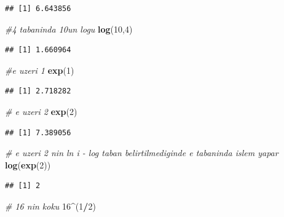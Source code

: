 \documentclass[
]{book}
\newenvironment{Shaded}{\begin{snugshade}}{\end{snugshade}}
\newcommand{\CommentTok}[1]{\textcolor[rgb]{0.56,0.35,0.01}{\textit{#1}}}
\newcommand{\DecValTok}[1]{\textcolor[rgb]{0.00,0.00,0.81}{#1}}
\newcommand{\KeywordTok}[1]{\textcolor[rgb]{0.13,0.29,0.53}{\textbf{#1}}}
\newcommand{\NormalTok}[1]{#1}
\newcommand{\OperatorTok}[1]{\textcolor[rgb]{0.81,0.36,0.00}{\textbf{#1}}}
\begin{document}
\begin{verbatim}
## [1] 6.643856
\end{verbatim}

\begin{Shaded}
\begin{Highlighting}[]
\CommentTok{\#4 tabaninda 10un log\textquotesingle{}u}
\KeywordTok{log}\NormalTok{(}\DecValTok{10}\NormalTok{,}\DecValTok{4}\NormalTok{) }
\end{Highlighting}
\end{Shaded}

\begin{verbatim}
## [1] 1.660964
\end{verbatim}

\begin{Shaded}
\begin{Highlighting}[]
\CommentTok{\#e uzeri 1}
\KeywordTok{exp}\NormalTok{(}\DecValTok{1}\NormalTok{) }
\end{Highlighting}
\end{Shaded}

\begin{verbatim}
## [1] 2.718282
\end{verbatim}

\begin{Shaded}
\begin{Highlighting}[]
\CommentTok{\# e uzeri 2}
\KeywordTok{exp}\NormalTok{(}\DecValTok{2}\NormalTok{) }
\end{Highlighting}
\end{Shaded}

\begin{verbatim}
## [1] 7.389056
\end{verbatim}

\begin{Shaded}
\begin{Highlighting}[]
 \CommentTok{\# e uzeri 2 nin ln i {-} log taban belirtilmediginde e tabaninda islem yapar}
\KeywordTok{log}\NormalTok{(}\KeywordTok{exp}\NormalTok{(}\DecValTok{2}\NormalTok{))}
\end{Highlighting}
\end{Shaded}

\begin{verbatim}
## [1] 2
\end{verbatim}

\begin{Shaded}
\begin{Highlighting}[]
\CommentTok{\# 16 nin koku}
\DecValTok{16}\OperatorTok{\^{}}\NormalTok{(}\DecValTok{1}\OperatorTok{/}\DecValTok{2}\NormalTok{)}
\end{Highlighting}
\end{Shaded}
\end{document}
